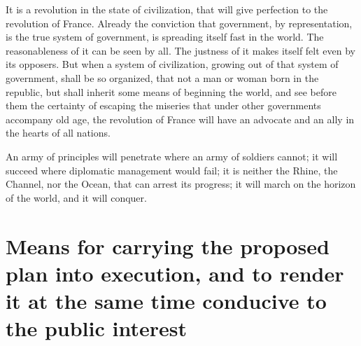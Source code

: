 It is a revolution in the state of civilization, that will give perfection to the revolution of France. Already the conviction that government, by representation, is the true system of government, is spreading itself fast in the world. The reasonableness of it can be seen by all. The justness of it makes itself felt even by its opposers. But when a system of civilization, growing out of that system of government, shall be so organized, that not a man or woman born in the republic, but shall inherit some means of beginning the world, and see before them the certainty of escaping the miseries that under other governments accompany old age, the revolution of France will have an advocate and an ally in the hearts of all nations.

An army of principles will penetrate where an army of soldiers cannot; it will succeed where diplomatic management would fail; it is neither the Rhine, the Channel, nor the Ocean, that can arrest its progress; it will march on the horizon of the world, and it will conquer.

\section*{Means for carrying the proposed plan into execution, and to render it at the same time conducive to the public interest}


